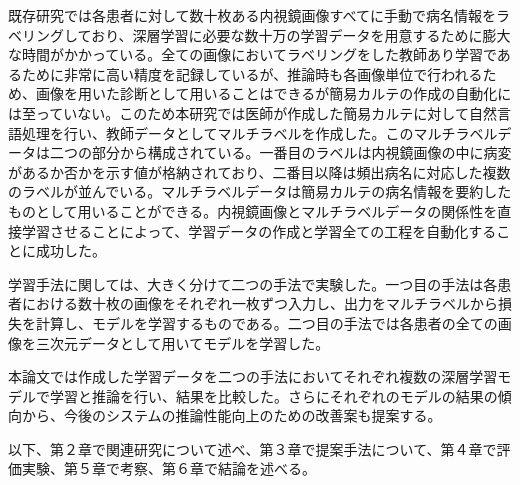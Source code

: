 既存研究では各患者に対して数十枚ある内視鏡画像すべてに手動で病名情報をラベリングしており、深層学習に必要な数十万の学習データを用意するために膨大な時間がかかっている。全ての画像においてラベリングをした教師あり学習であるために非常に高い精度を記録しているが、推論時も各画像単位で行われるため、画像を用いた診断として用いることはできるが簡易カルテの作成の自動化には至っていない。このため本研究では医師が作成した簡易カルテに対して自然言語処理を行い、教師データとしてマルチラベルを作成した。このマルチラベルデータは二つの部分から構成されている。一番目のラベルは内視鏡画像の中に病変があるか否かを示す値が格納されており、二番目以降は頻出病名に対応した複数のラベルが並んでいる。マルチラベルデータは簡易カルテの病名情報を要約したものとして用いることができる。内視鏡画像とマルチラベルデータの関係性を直接学習させることによって、学習データの作成と学習全ての工程を自動化することに成功した。

学習手法に関しては、大きく分けて二つの手法で実験した。一つ目の手法は各患者における数十枚の画像をそれぞれ一枚ずつ入力し、出力をマルチラベルから損失を計算し、モデルを学習するものである。二つ目の手法では各患者の全ての画像を三次元データとして用いてモデルを学習した。

本論文では作成した学習データを二つの手法においてそれぞれ複数の深層学習モデルで学習と推論を行い、結果を比較した。さらにそれぞれのモデルの結果の傾向から、今後のシステムの推論性能向上のための改善案も提案する。

以下、第２章で関連研究について述べ、第３章で提案手法について、第４章で評価実験、第５章で考察、第６章で結論を述べる。
